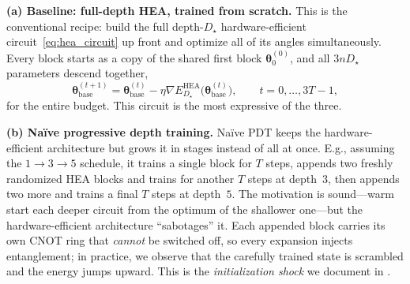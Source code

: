 \documentclass[11pt]{article}
\theoremstyle{plain}
\theoremstyle{plain}
\begin{document}
\medskip\noindent\textbf{(a) Baseline: full-depth HEA, trained from
scratch.}
This is the conventional recipe: build the full depth-$D_\star$
hardware-efficient circuit~\eqref{eq:hea_circuit} up front and optimize
all of its angles simultaneously.  Every block starts as a copy of the
shared first block $\bm\theta_0^{(0)}$, and all $3nD_\star$ parameters
descend together,
\begin{equation}\label{eq:baseline_opt}
  \bm\theta^{(t+1)}_{\mathrm{base}}
  =\bm\theta^{(t)}_{\mathrm{base}}
   -\eta \nabla E_{D_\star}^{\mathrm{HEA}}
    \bigl(\bm\theta^{(t)}_{\mathrm{base}}\bigr),
  \qquad t=0,\ldots,3T{-}1,
\end{equation}
for the entire budget.  This circuit is the most expressive of the
three. %

\medskip\noindent\textbf{(b) Na\"ive progressive depth training.}
Na\"ive PDT keeps the hardware-efficient architecture but grows it in
stages instead of all at once.  
E.g., assuming the $1\to3\to5$ schedule, it trains a single block for $T$ steps,
appends two freshly randomized HEA blocks and trains for another $T$
steps at depth~$3$, then appends two more and trains a final $T$ steps
at depth~$5$. 
The motivation is sound---warm
start each deeper circuit from the optimum of the shallower one---but
the hardware-efficient architecture ``sabotages'' it.  Each appended block
carries its own CNOT ring that \emph{cannot} be switched off, so every
expansion injects entanglement; in practice, we observe that the
carefully trained state is scrambled and the energy jumps upward.  This
is the \emph{initialization shock} we document in .
\end{document}
